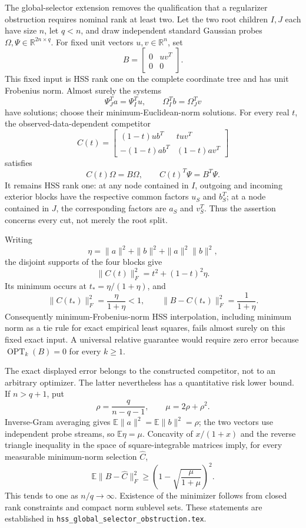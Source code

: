 \documentclass[11pt,oneside,openany,a4paper]{book}
\numberwithin{equation}{chapter}
\theoremstyle{definition}
\theoremstyle{remark}
\newcommand{\sourcefile}[1]{{\small\nolinkurl{#1}}}
\begin{document}
The global-selector extension removes the qualification that a
regularizer obstruction requires nominal rank at least two.  Let the
two root children $I,J$ each have size $n$, let $q<n$, and draw
independent standard Gaussian probes $\Omega,\Psi\in\mathbb R^{2n\times q}$.
For fixed unit vectors $u,v\in\mathbb R^n$, set
\[
 B=\begin{bmatrix}0&uv^T\\0&0\end{bmatrix}.
\]
This fixed input is HSS rank one on the complete coordinate tree and has
unit Frobenius norm.  Almost surely the systems
\[
 \Psi_J^Ta=\Psi_I^Tu,\qquad
 \Omega_I^Tb=\Omega_J^Tv
\]
have solutions; choose their minimum-Euclidean-norm solutions.  For every
real $t$, the observed-data-dependent competitor
\[
 C(t)=\begin{bmatrix}
 (1-t)ub^T&tuv^T\\
 -(1-t)ab^T&(1-t)av^T
 \end{bmatrix}
\]
satisfies
\[
 C(t)\Omega=B\Omega,\qquad C(t)^T\Psi=B^T\Psi.
\]
It remains HSS rank one: at any node contained in $I$, outgoing and
incoming exterior blocks have the respective common factors $u_S$ and
$b_S^T$; at a node contained in $J$, the corresponding factors are $a_S$
and $v_S^T$.  Thus the assertion concerns every cut, not merely the root
split.

Writing
\[
 \eta=\|a\|^2+\|b\|^2+\|a\|^2\|b\|^2,
\]
the disjoint supports of the four blocks give
\[
 \|C(t)\|_F^2=t^2+(1-t)^2\eta.
\]
Its minimum occurs at $t_*={\eta}/({1+\eta})$, and
\[
 \|C(t_*)\|_F^2=\frac{\eta}{1+\eta}<1,
 \qquad
 \|B-C(t_*)\|_F^2=\frac1{1+\eta}.
\]
Consequently minimum-Frobenius-norm HSS interpolation, including minimum
norm as a tie rule for exact empirical least squares, fails almost
surely on this fixed exact input.  A universal relative guarantee would
require zero error because $\operatorname{OPT}_k(B)=0$ for every $k\ge1$.

The exact displayed error belongs to the constructed competitor, not
to an arbitrary optimizer.  The latter nevertheless has a quantitative
risk lower bound.  If $n>q+1$, put
\[
 \rho=\frac{q}{n-q-1},\qquad \mu=2\rho+\rho^2.
\]
Inverse-Gram averaging gives $\mathbb E\|a\|^2=
\mathbb E\|b\|^2=\rho$; the two vectors use independent probe streams,
so $\mathbb E\eta=\mu$.  Concavity of $x/(1+x)$ and the reverse triangle
inequality in the space of square-integrable matrices imply, for every
measurable minimum-norm selection $\widehat C$,
\[
 \mathbb E\|B-\widehat C\|_F^2
 \ge\left(1-\sqrt{\frac{\mu}{1+\mu}}\right)^2.
\]
This tends to one as $n/q\to\infty$.  Existence of the minimizer follows
from closed rank constraints and compact norm sublevel sets.  These
statements are established in \sourcefile{hss_global_selector_obstruction.tex}.
\end{document}
